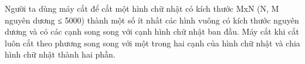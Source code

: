 Người ta dùng máy cắt để cắt một hình chữ nhật có kích thước MxN (N, M nguyên dương ≤ 5000) thành một số ít nhất các hình vuông có kích thước nguyên dương và có các cạnh song song với cạnh hình chữ nhật ban đầu. Máy cắt khi cắt luôn cắt theo phương song song với một trong hai cạnh của hình chữ nhật và chia hình chữ nhật thành hai phần.